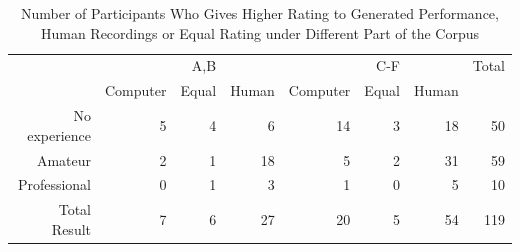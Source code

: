 \begin{table}
   \centering
   \caption{Number of Participants Who Gives Higher Rating to Generated Performance, Human Recordings or Equal Rating under Different Part of the Corpus}
   \label{tab:good-bad_count}
   \begin{tabular}{r|rrr|rrr|r}
\hline
&&A,B&&&C-F&&Total\\
&Computer&Equal&Human&Computer&Equal&Human&\\
      \hline
No experience&5&4&6&14&3&18&50\\
Amateur&2&1&18&5&2&31&59\\
Professional&0&1&3&1&0&5&10\\
      \hline
Total Result&7&6&27&20&5&54&119\\
      \hline
   \end{tabular}
\end{table}
